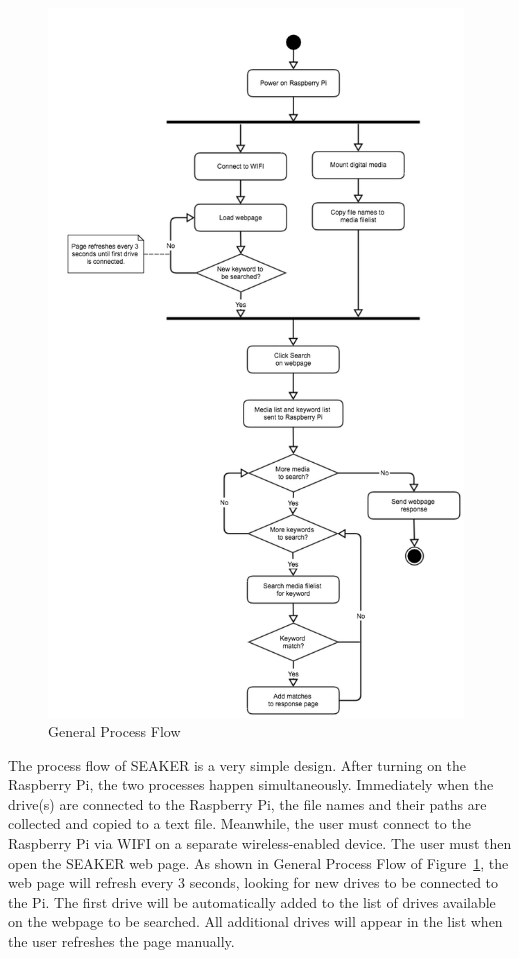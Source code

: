 \documentclass[12pt]{article}
\begin{document}
\begin{figure}[H]
  \begin{center}
  \includegraphics[width=11cm]{images/ProcessFlow.png}
  \caption{General Process Flow}
  \label{fig:ProcessFlow}
  \end{center}
\end{figure}

The process flow of SEAKER is a very simple design. After turning on
the Raspberry Pi, the two processes happen simultaneously. Immediately
when the drive(s) are connected to the Raspberry Pi, the file names
and their paths are collected and copied to a text file. Meanwhile,
the user must connect to the Raspberry Pi via WIFI on a separate
wireless-enabled device. The user must then open the SEAKER web page.
As shown in General Process Flow of Figure~\ref{fig:ProcessFlow},
the web page will refresh every 3 seconds, looking for new drives to
be connected to the Pi. The first drive will be automatically added
to the list of drives available on the webpage to be searched. All
additional drives will appear in the list when the user refreshes
the page manually.\\
\end{document}

